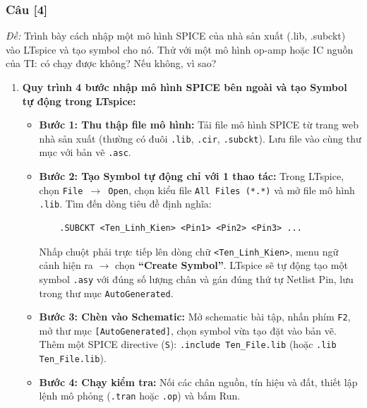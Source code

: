 \documentclass[12pt,a4paper]{article}
\newcommand{\cauhoi}[2]{%
  \subsubsection{Câu [#1]}
  \begin{tcolorbox}[colback=white,colframe=guidegray!70,boxrule=0.4pt,arc=1pt,left=5pt,right=5pt,top=2pt,bottom=2pt]
  \small\textit{Đề:} #2
  \end{tcolorbox}
  \par\vspace{4pt}}
\begin{document}
\cauhoi{4}{Trình bày cách nhập một mô hình SPICE của nhà sản xuất (.lib, .subckt) vào LTspice và tạo symbol cho nó. Thử với một mô hình op-amp hoặc IC nguồn của TI: có chạy được không? Nếu không, vì sao?}

\begin{enumerate}[label=(\alph*)]
  \item \textbf{Quy trình 4 bước nhập mô hình SPICE bên ngoài và tạo Symbol tự động trong LTspice:}
  \begin{itemize}
    \item \textbf{Bước 1: Thu thập file mô hình:} Tải file mô hình SPICE từ trang web nhà sản xuất (thường có đuôi \texttt{.lib}, \texttt{.cir}, \texttt{.subckt}). Lưu file vào cùng thư mục với bản vẽ \texttt{.asc}.
    \item \textbf{Bước 2: Tạo Symbol tự động chỉ với 1 thao tác:} Trong LTspice, chọn \texttt{File $\rightarrow$ Open}, chọn kiểu file \texttt{All Files (*.*)} và mở file mô hình \texttt{.lib}. Tìm đến dòng tiêu đề định nghĩa:
    \begin{verbatim}
    .SUBCKT <Ten_Linh_Kien> <Pin1> <Pin2> <Pin3> ...
    \end{verbatim}
    Nhấp chuột phải trực tiếp lên dòng chữ \texttt{<Ten\_Linh\_Kien>}, menu ngữ cảnh hiện ra $\rightarrow$ chọn \textbf{``Create Symbol''}. LTspice sẽ tự động tạo một symbol \texttt{.asy} với đúng số lượng chân và gán đúng thứ tự Netlist Pin, lưu trong thư mục \texttt{AutoGenerated}.
    \item \textbf{Bước 3: Chèn vào Schematic:} Mở schematic bài tập, nhấn phím \texttt{F2}, mở thư mục \texttt{[AutoGenerated]}, chọn symbol vừa tạo đặt vào bản vẽ. Thêm một SPICE directive (\texttt{S}): \texttt{.include Ten\_File.lib} (hoặc \texttt{.lib Ten\_File.lib}).
    \item \textbf{Bước 4: Chạy kiểm tra:} Nối các chân nguồn, tín hiệu và đất, thiết lập lệnh mô phỏng (\texttt{.tran} hoặc \texttt{.op}) và bấm Run.
  \end{itemize}


\end{enumerate}
\end{document}
